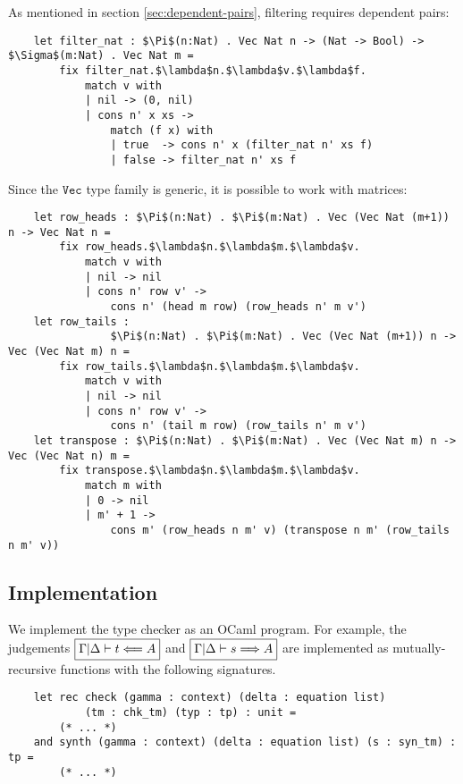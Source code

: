 \documentclass[acmsmall,nonacm]{acmart}
\begin{document}
\noindent
As mentioned in section \ref{sec:dependent-pairs}, filtering requires dependent pairs:

\begin{lstlisting}
    let filter_nat : $\Pi$(n:Nat) . Vec Nat n -> (Nat -> Bool) -> $\Sigma$(m:Nat) . Vec Nat m =
        fix filter_nat.$\lambda$n.$\lambda$v.$\lambda$f.
            match v with
            | nil -> (0, nil)
            | cons n' x xs ->
                match (f x) with
                | true  -> cons n' x (filter_nat n' xs f)
                | false -> filter_nat n' xs f
\end{lstlisting}

\noindent
Since the $\texttt{Vec}$ type family is generic, it is possible to work with matrices:

\begin{lstlisting}
    let row_heads : $\Pi$(n:Nat) . $\Pi$(m:Nat) . Vec (Vec Nat (m+1)) n -> Vec Nat n =
        fix row_heads.$\lambda$n.$\lambda$m.$\lambda$v.
            match v with
            | nil -> nil
            | cons n' row v' ->
                cons n' (head m row) (row_heads n' m v')
    let row_tails :
                $\Pi$(n:Nat) . $\Pi$(m:Nat) . Vec (Vec Nat (m+1)) n -> Vec (Vec Nat m) n =
        fix row_tails.$\lambda$n.$\lambda$m.$\lambda$v.
            match v with
            | nil -> nil
            | cons n' row v' ->
                cons n' (tail m row) (row_tails n' m v')
    let transpose : $\Pi$(n:Nat) . $\Pi$(m:Nat) . Vec (Vec Nat m) n -> Vec (Vec Nat n) m =
        fix transpose.$\lambda$n.$\lambda$m.$\lambda$v.
            match m with
            | 0 -> nil
            | m' + 1 ->
                cons m' (row_heads n m' v) (transpose n m' (row_tails n m' v))
\end{lstlisting}

\subsection{Implementation}
\label{sec:implementation}

We implement the type checker as an OCaml program.
For example, the judgements $\boxed{\Gamma|\Delta \vdash t \Longleftarrow A}$ and $\boxed{\Gamma|\Delta \vdash s \Longrightarrow A}$ are implemented as mutually-recursive functions with the following signatures.

\begin{lstlisting}
    let rec check (gamma : context) (delta : equation list)
            (tm : chk_tm) (typ : tp) : unit =
        (* ... *)
    and synth (gamma : context) (delta : equation list) (s : syn_tm) : tp =
        (* ... *)
\end{lstlisting}
\end{document}
